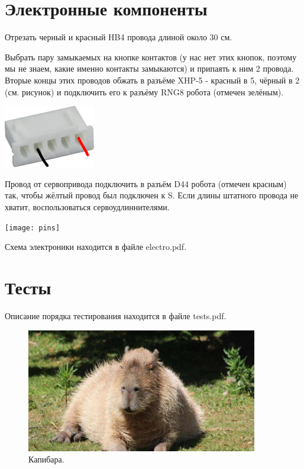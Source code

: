 \documentclass[12pt,a4paper,oneside]{article}
\begin{document}
\section{Электронные компоненты}
Отрезать черный и красный HB4 провода длиной около 30 см.

Выбрать пару замыкаемых на кнопке контактов (у нас нет этих кнопок, поэтому мы
не знаем, какие именно контакты замыкаются) и припаять к ним 2 провода. Вторые
концы этих проводов обжать в разъёме XHP-5 - красный в 5, чёрный в 2 (см.
рисунок) и подключить его к разъёму RNG8 робота (отмечен зелёным).

\includegraphics[width=0.3\textwidth]{buttoncontacts}

Провод от сервопривода подключить в разъём D44 робота (отмечен красным) так,
чтобы жёлтый провод был подключен к S. Если длины штатного провода не хватит,
воспользоваться сервоудлиннителями.

\texttt{[image: pins]}

Схема электроники находится в файле electro.pdf.

\section{Тесты}
Описание порядка тестирования находится в файле tests.pdf.

\newpage

\begin{figure}
\centering
\includegraphics[width=0.9\textwidth]{capybara.jpg}
\caption{\label{fig:capybara}Капибара.}
\end{figure}
\end{document}

